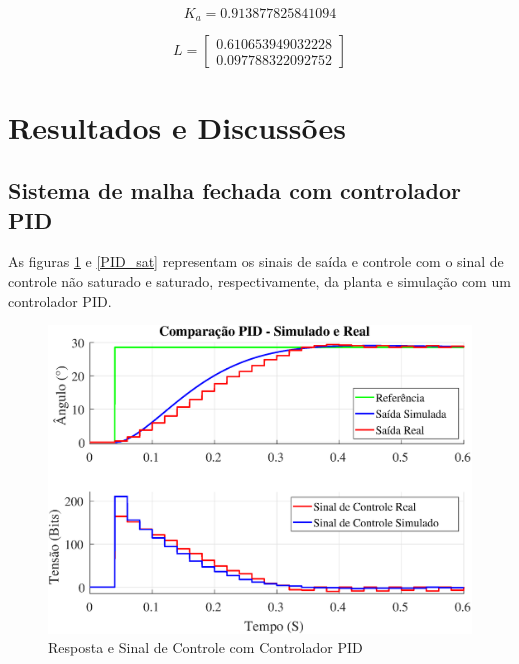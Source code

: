 \documentclass[conference,harvard,brazil,english]{sbatex}
\begin{document}
           \begin{equation}
               K_a=0.913877825841094
           \end{equation}
           
           \begin{equation}
               L=\begin{bmatrix}0.610653949032228\\
               0.097788322092752\end{bmatrix}
           \end{equation}
           
            
            
            
        
    
    \section{Resultados e Discussões}
    
        \subsection{Sistema de malha fechada com controlador PID}
        
        
            As figuras \ref{PID_n_sat} e \ref{PID_sat} representam os sinais de saída e controle com o sinal de controle não saturado e saturado, respectivamente, da planta e simulação com um controlador PID.
        
            \begin{figure}[!htb] 
                \centering
                    \includegraphics[width=\columnwidth]{imagens/malhafechada/SimuRealPIDnSat.eps}{
                    \small
                    \centering
                    \caption{Resposta e Sinal de Controle com Controlador PID}
                    \label{PID_n_sat}}
            \end{figure}
        
\end{document}
